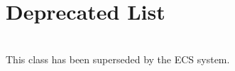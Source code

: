 \chapter{Deprecated List }
\hypertarget{deprecated}{}\label{deprecated}

\begin{DoxyRefList}
\item[{\parbox[t]{\linewidth}{Class \doxylink{classGameObject}{Game\+Object} }}]\hfill \\
\label{deprecated__deprecated000001}%
%
This class has been superseded by the ECS system. 
\end{DoxyRefList}